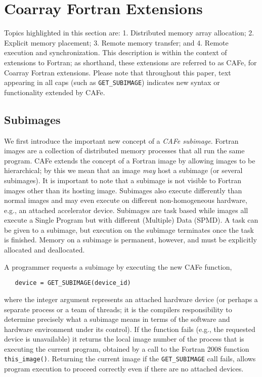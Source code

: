 \section{Coarray Fortran Extensions}

Topics highlighted in this section are: 1. Distributed memory array allocation;
2. Explicit memory placement; 3. Remote memory transfer; and 4. Remote execution
and synchronization.  This
description is within the context of extensions to Fortran; as shorthand, these extensions
are referred to as CAFe, for Coarray Fortran extensions.
Please note that throughout this paper, text appearing in all caps (such as
\texttt{GET\_SUBIMAGE}) indicates new syntax or functionality extended by CAFe.



\subsection{Subimages}

We first introduce the important new concept of a \emph{CAFe subimage}.  Fortran images
are a collection of distributed memory processes that all run the same program.  CAFe
extends the concept of a Fortran image by allowing images to be hierarchical; by this we
mean that an image \emph{may} host a subimage (or several subimages).  It is important to
note that a subimage is not visible to Fortran images other than its hosting image.
Subimages also execute differently than normal images and may even execute on different
non-homogeneous hardware, e.g., an attached accelerator device.  Subimages are task based
while images all execute a Single Program but with different (Multiple) Data (SPMD).  A
task can be given to a subimage, but execution on the subimage terminates once the task is
finished.  Memory on a subimage is permanent, however, and must be explicitly allocated
and deallocated.

A programmer requests a subimage by executing the new CAFe function,

\begin{verbatim}
   device = GET_SUBIMAGE(device_id)
\end{verbatim}

\noindent where the integer argument represents an attached hardware device (or perhaps a separate
process or a team of threads; it is the compilers responsibility to determine precisely
what a subimage means in terms of the software and hardware environment under its
control).  If the function fails (e.g., the requested device is unavailable) it returns
the local image number of the process that is executing the current program, obtained by a
call to the Fortran 2008 function \texttt{this\_image()}.  Returning the current image if
the \texttt{GET\_SUBIMAGE} call fails, allows program execution to proceed correctly even if
there are no attached devices.


